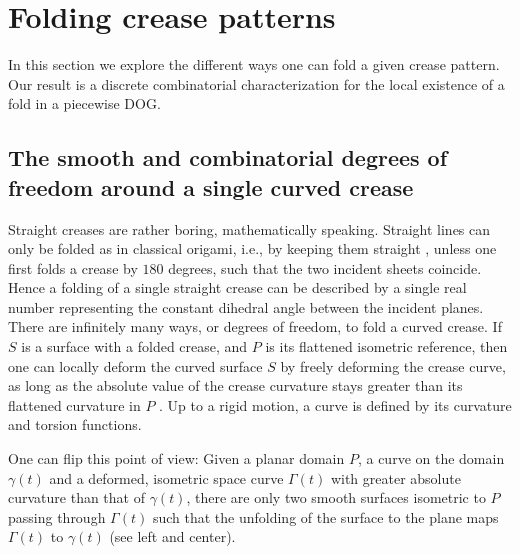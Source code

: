 
\section{Folding crease patterns} \label{sec:folding}
In this section we explore the different ways one can fold a given crease pattern. Our result is a discrete combinatorial characterization for the local existence of a fold in a piecewise DOG.

\subsection{The smooth and combinatorial degrees of freedom around a single curved crease}
\label{sec:smooth-combinatorial}

Straight creases are rather boring, mathematically speaking. Straight lines can only be folded as in classical origami, i.e., by keeping them straight \cite{demaine_lens}, unless one first folds a crease by $180$ degrees, such that the two incident sheets coincide. Hence a folding of a single straight crease can be described by a single real number representing the constant dihedral angle between the incident planes. There are infinitely many ways, or degrees of freedom, to fold a curved crease. If $S$ is a surface with a folded crease, and $P$ is its flattened isometric reference, then one can locally deform the curved surface $S$ by freely deforming the crease curve, as long as the absolute value of the crease curvature stays greater than its flattened curvature in $P$ \cite{more_on_paper}. Up to a rigid motion, a curve is defined by its curvature and torsion functions.

One can flip this point of view: Given a planar domain $P$, a curve on the domain $\gamma(t)$ and a deformed, isometric space curve $\Gamma(t)$ with greater absolute curvature than that of $\gamma(t)$, there are only two smooth surfaces isometric to $P$ passing through $\Gamma(t)$ such that the unfolding of the surface to the plane maps $\Gamma(t)$ to $\gamma(t)$ \cite{mathematical_omnibus} (see  left and center).


